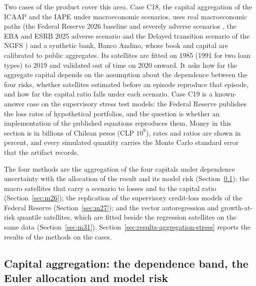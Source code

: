 Two cases of the product cover this area. Case C18, the capital aggregation of the ICAAP and the IAPE under macroeconomic
scenarios, uses real macroeconomic paths (the Federal Reserve 2026 baseline and severely adverse scenarios
\citep{aggregation-stress:fedscen2026}, the EBA and ESRB 2025 adverse scenario \citep{aggregation-stress:ebanote2025} and the
Delayed transition scenario of the NGFS \citep{aggregation-stress:ngfs2024}) and a synthetic bank, Banco Andino, whose book and
capital are calibrated to public aggregates. Its satellites are fitted on 1985 (1991 for two loan types) to 2019 and validated out of time on 2020
onward. It asks how far the aggregate capital depends on the assumption about the dependence between the four risks, whether
satellites estimated before an episode reproduce that episode, and how far the capital ratio falls under each scenario. Case C19
is a known-answer case on the supervisory stress test models: the Federal Reserve publishes the loss rates of hypothetical
portfolios, and the question is whether an implementation of the published equations reproduces them. Money in this section is
in billions of Chilean pesos (CLP $10^{9}$), rates and ratios are shown in percent, and every simulated quantity carries the
Monte Carlo standard error that the artifact records.

The four methods are the aggregation of the four capitals under dependence uncertainty with the allocation of the result and its
model risk (Section~\ref{sec:m25}); the macro satellites that carry a scenario to losses and to the capital ratio
(Section~\ref{sec:m26}); the replication of the supervisory credit-loss models of the Federal Reserve
(Section~\ref{sec:m27}); and the vector autoregression and growth-at-risk quantile satellites, which are fitted beside the
regression satellites on the same data (Section~\ref{sec:m31}). Section~\ref{sec:results-aggregation-stress} reports the
results of the methods on the cases.

\subsection{Capital aggregation: the dependence band, the Euler allocation and model risk}
\label{sec:m25}

